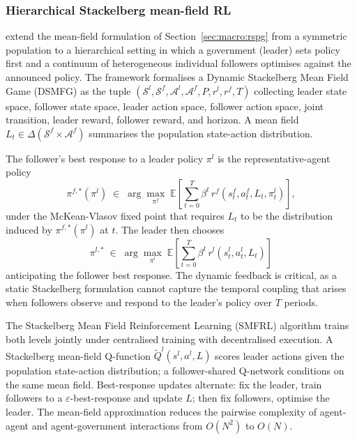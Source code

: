 \subsubsection{Hierarchical Stackelberg mean-field RL}
\label{sec:macro:dsmfg}

\citet{Mi2025dsmfg} extend the mean-field formulation of
Section~\ref{sec:macro:rspg} from a symmetric population to a
hierarchical setting in which a government (leader) sets policy
first and a continuum of heterogeneous individual followers
optimises against the announced policy. The framework formalises a
Dynamic Stackelberg Mean Field Game (DSMFG) as the tuple
$(\mathcal S^l, \mathcal S^f, \mathcal A^l, \mathcal A^f, P, r^l,
r^f, T)$ collecting leader state space, follower state space, leader
action space, follower action space, joint transition, leader
reward, follower reward, and horizon. A mean field
$L_t \in \Delta(\mathcal S^f \times \mathcal A^f)$ summarises the
population state-action distribution.

The follower's best response to a leader policy $\pi^l$ is the
representative-agent policy
\begin{equation}
\pi^{f,*}(\pi^l) \;\in\; \arg\max_{\pi^f}\;
\mathbb E\!\left[\sum_{t=0}^{T} \beta^t\, r^f(s^f_t, a^f_t, L_t,
\pi^l_t)\right],
\label{eq:macro:dsmfg-follower}
\end{equation}
under the McKean-Vlasov fixed point that requires $L_t$ to be the
distribution induced by $\pi^{f,*}(\pi^l)$ at $t$. The leader then
chooses
\begin{equation}
\pi^{l,*} \;\in\; \arg\max_{\pi^l}\;
\mathbb E\!\left[\sum_{t=0}^{T} \beta^t\, r^l(s^l_t, a^l_t, L_t)\right]
\label{eq:macro:dsmfg-leader}
\end{equation}
anticipating the follower best response. The dynamic feedback is
critical, as a static Stackelberg formulation cannot capture the
temporal coupling that arises when followers observe and respond to
the leader's policy over $T$ periods.

The Stackelberg Mean Field Reinforcement Learning (SMFRL) algorithm
trains both levels jointly under centralised training with
decentralised execution. A Stackelberg mean-field Q-function
$\widetilde Q^l(s^l, a^l, L)$ scores leader actions given the
population state-action distribution; a follower-shared Q-network
conditions on the same mean field. Best-response updates alternate:
fix the leader, train followers to a $\varepsilon$-best-response and
update $L$; then fix followers, optimise the leader. The mean-field
approximation reduces the pairwise complexity of agent-agent and
agent-government interactions from $O(N^2)$ to $O(N)$.

